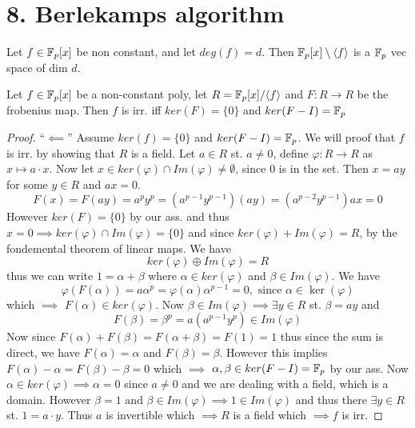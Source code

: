 \chapter*{8. Berlekamps algorithm}
\begin{proposition}
  Let $f \in \mathbb{F}_{p}[x]$ be non constant, and let $deg(f) = d$. Then $\mathbb{F}_{p}[x] \setminus \langle f\rangle$ is a $\mathbb{F}_{p}$ vec space of dim $d$.
\end{proposition}
\begin{theorem}
Let $f \in \mathbb{F}_{p}[x]$ be a non-constant poly, let $R = \mathbb{F}_{p}[x] / \langle f\rangle$ and $F: R \to R$ be the frobenius map. Then $f$ is irr. iff $ker(F) = \{0\}$ and $ker(F - I) = \mathbb{F}_{p}$
\end{theorem}
\begin{proof}
  ``$\impliedby$'' Assume $ker(f) = \{0\}$ and $ker(F - I) = \mathbb{F}_{p}$. We will proof that $f$ is irr. by showing that $R$ is a field.
  Let $a \in R$ st. $a \neq 0$, define $\varphi: R \to R$ as $x \mapsto a \cdot x$. Now let $x \in ker(\varphi) \cap Im(\varphi) \neq \emptyset$, since $0$ is in the set. Then $x = ay$ for some $y \in R$ and $ax = 0$.
  \begin{equation*}
    F(x) = F(ay) = a^{p}y^{p} = (a^{p - 1}y^{p - 1})(ay) = (a^{p - 2}y^{p - 1})ax = 0
  \end{equation*}
  However $ker(F) = \{0\}$ by our ass. and thus $x = 0 \implies ker(\varphi) \cap Im(\varphi) = \{0\}$ and since $ker(\varphi) + Im(\varphi) = R$, by the fondemental theorem of linear maps. We have
  \begin{equation*}
    ker(\varphi) \oplus Im(\varphi) = R
  \end{equation*}
  thus we can write $1 = \alpha + \beta$ where $\alpha \in ker(\varphi)$ and $\beta \in Im(\varphi)$. We have
  \begin{equation*}
    \varphi(F(\alpha)) = a \alpha^{p} = \varphi(\alpha) \alpha^{p - 1} = 0, \text{ since } \alpha \in \ker(\varphi)
  \end{equation*}
  which $\implies$ $F(\alpha) \in ker(\varphi)$. Now $\beta \in Im(\varphi) \implies \exists y \in R$ st. $\beta = a y$ and
  \begin{equation*}
    F(\beta) = \beta^{p} = a(a^{p - 1}y^{p}) \in Im(\varphi)
  \end{equation*}
  Now since $F(\alpha) + F(\beta) = F(\alpha + \beta) = F(1) = 1$ thus since the sum is direct, we have $F(\alpha) = \alpha$ and $F(\beta) = \beta$. However this implies $F(\alpha) - \alpha = F(\beta) - \beta = 0$ which $\implies$ $\alpha, \beta \in ker(F-I) = \mathbb{F}_{p}$ by our ass. Now $\alpha \in ker(\varphi) \implies \alpha = 0$ since $a \neq 0$ and we are dealing with a field, which is a domain.
  However $\beta = 1 \text{ and } \beta \in Im(\varphi) \implies 1 \in Im(\varphi)$ and thus there $\exists y \in R$ st. $1 = a \cdot y$. Thus $a$ is invertible which $\implies R$ is a field which $\implies f$ is irr.
\end{proof}
